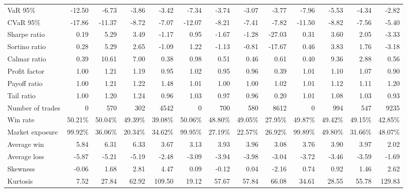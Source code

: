 \begin{table}[H]
\begin{adjustbox}{max width=\linewidth, max totalheight=0.90\textheight}
\begin{tabular}{lrrrrrrrrrrrr}
VaR 95\%                  & -12.50 & -6.73 & -3.86 & -3.42 & -7.34 & -3.74 & -3.07 & -3.77 & -7.96 & -5.53 & -4.34 & -2.82 \\
CVaR 95\%                 & -17.86 & -11.37 & -8.72 & -7.07 & -12.07 & -8.21 & -7.41 & -7.82 & -11.50 & -8.82 & -7.56 & -5.40 \\
Sharpe ratio              & 0.19 & 5.29 & 3.49 & -1.17 & 0.95 & -1.67 & -1.28 & -27.03 & 0.31 & 3.60 & 2.05 & -3.33 \\
Sortino ratio             & 0.28 & 5.29 & 2.65 & -1.09 & 1.22 & -1.13 & -0.81 & -17.67 & 0.46 & 3.83 & 1.76 & -3.18 \\
Calmar ratio              & 0.39 & 10.61 & 7.00 & 0.38 & 0.98 & 0.51 & 0.46 & 0.61 & 0.40 & 9.36 & 2.88 & 0.56 \\
Profit factor             & 1.00 & 1.21 & 1.19 & 0.95 & 1.02 & 0.95 & 0.96 & 0.39 & 1.01 & 1.10 & 1.07 & 0.90 \\
Payoff ratio              & 1.00 & 1.21 & 1.22 & 1.48 & 1.01 & 1.00 & 1.00 & 1.02 & 1.01 & 1.12 & 1.11 & 1.20 \\
Tail ratio                & 1.00 & 1.20 & 1.24 & 0.96 & 1.03 & 0.97 & 0.96 & 0.20 & 1.01 & 1.08 & 1.03 & 0.93 \\
Number of trades          & 0 & 570 & 302 & 4542 & 0 & 700 & 580 & 8612 & 0 & 994 & 547 & 9235 \\
Win rate                  & 50.21\% & 50.04\% & 49.39\% & 39.08\% & 50.06\% & 48.80\% & 49.05\% & 27.95\% & 49.87\% & 49.42\% & 49.15\% & 42.85\% \\
Market exposure           & 99.92\% & 36.06\% & 20.34\% & 34.62\% & 99.95\% & 27.19\% & 22.57\% & 26.92\% & 99.89\% & 49.80\% & 31.66\% & 48.07\% \\
Average win               & 5.84 & 6.31 & 6.33 & 3.67 & 3.13 & 3.93 & 3.96 & 3.08 & 3.76 & 3.90 & 3.97 & 2.02 \\
Average loss              & -5.87 & -5.21 & -5.19 & -2.48 & -3.09 & -3.94 & -3.98 & -3.04 & -3.72 & -3.46 & -3.59 & -1.69 \\
Skewness                  & -0.06 & 1.68 & 2.81 & 4.47 & 0.09 & -0.12 & 0.04 & -2.16 & 0.74 & 0.92 & 1.46 & 2.62 \\
Kurtosis                  & 7.52 & 27.84 & 62.92 & 109.50 & 19.12 & 57.67 & 57.84 & 66.08 & 34.61 & 28.55 & 55.78 & 129.83 \\
\bottomrule
\end{tabular}
\end{adjustbox}

\end{table}

